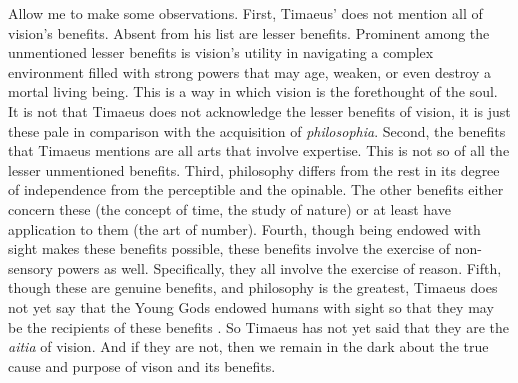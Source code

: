 Allow me to make some observations. First, Timaeus' does not mention all of vision's benefits. Absent from his list are lesser benefits. Prominent among the unmentioned lesser benefits is vision's utility in navigating a complex environment filled with strong powers that may age, weaken, or even destroy a mortal living being. This is a way in which vision is the forethought of the soul. It is not that Timaeus does not acknowledge the lesser benefits of vision, it is just these pale in comparison with the acquisition of \emph{philosophia}. Second, the benefits that Timaeus mentions are all arts that involve expertise. This is not so of all the lesser unmentioned benefits. Third, philosophy differs from the rest in its degree of independence from the perceptible and the opinable. The other benefits either concern these (the concept of time, the study of nature) or at least have application to them (the art of number). Fourth, though being endowed with sight makes these benefits possible, these benefits involve the exercise of non-sensory powers as well. Specifically, they all involve the exercise of reason.  Fifth, though these are genuine benefits, and philosophy is the greatest, Timaeus does not yet say that the Young Gods endowed humans with sight so that they may be the recipients of these benefits \citep[107]{Johansen:2004dx}. So Timaeus has not yet said that they are the \emph{aitia} of vision. And if they are not, then we remain in the dark about the true cause and purpose of vison and its benefits.

